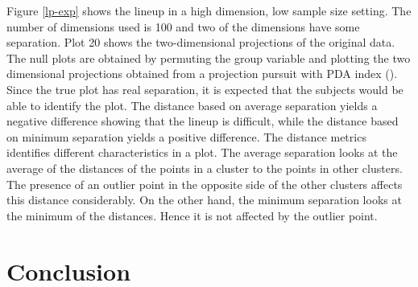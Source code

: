 \documentclass[12]{article}
\begin{document}
Figure \ref{lp-exp} shows the lineup in a high dimension, low sample size setting. The number of dimensions used is 100 and two of the dimensions have some separation. Plot 20 shows the two-dimensional projections of the original data. The null plots are obtained by permuting the group variable and plotting the two dimensional projections obtained from a projection pursuit with PDA index (\cite{lee:2009}). Since the true plot has real separation, it is expected that the subjects would be able to identify the plot. The distance based on average separation yields a negative difference showing that the lineup is difficult, while the distance based on minimum separation yields a positive difference. The distance metrics identifies different characteristics in a plot. The average separation looks at the average of the distances of the points in a cluster to the points in other clusters. The presence of an outlier point in the opposite side of the other clusters affects this distance considerably. On the other hand, the minimum separation looks at the minimum of the distances. Hence it is not affected by the outlier point. 


\section{Conclusion}
\end{document}
